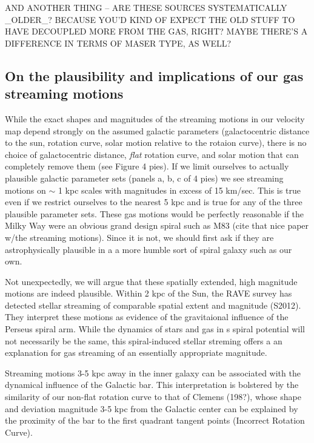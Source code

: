 AND ANOTHER THING -- ARE THESE SOURCES SYSTEMATICALLY _OLDER_? BECAUSE YOU'D KIND OF EXPECT THE OLD STUFF TO HAVE DECOUPLED MORE FROM THE GAS, RIGHT? MAYBE THERE'S A DIFFERENCE IN TERMS OF MASER TYPE, AS WELL?

\subsection{On the plausibility and implications of our gas streaming motions}
While the exact shapes and magnitudes of the streaming motions in our velocity map depend strongly on the assumed galactic parameters (galactocentric distance to the sun, rotation curve, solar motion relative to the rotaion curve), there is no choice of galactocentric distance, \emph{flat} rotation curve, and solar motion that can completely remove them (see Figure 4 pies).
If we limit ourselves to actually plausible galactic parameter sets (panels a, b, c of 4 pies) we see streaming motions on $\sim$ 1 kpc scales with magnitudes in excess of 15 km/sec. 
This is true even if we restrict ourselves to the nearest 5 kpc and is true for any of the three plausible parameter sets. 
These gas motions would be perfectly reasonable if the Milky Way were an obvious grand design spiral such as M83 (cite that nice paper w/the streaming motions). 
Since it is not, we should first ask if they are astrophysically plausible in a a more humble sort of spiral galaxy such as our own. 

Not unexpectedly, we will argue that these spatially extended, high magnitude motions are indeed plausible.
Within 2 kpc of the Sun, the RAVE survey has detected stellar streaming of comparable spatial extent and magnitude (S2012). They interpret these motions as evidence of the gravitaional influence of the Perseus spiral arm.
While the dynamics of stars and gas in s spiral potential will not necessarily be the same, this spiral-induced stellar streming offers a an explanation for gas streaming of an essentially appropriate magnitude.

Streaming motions 3-5 kpc away in the inner galaxy can be associated with the dynamical influence of the Galactic bar. 
This interpretation is bolstered by the similarity of our non-flat rotation curve to that of Clemens (198?), whose shape and deviation magnitude 3-5 kpc from the Galactic center can be explained by the proximity of the bar to the first quadrant tangent points (Incorrect Rotation Curve). 

